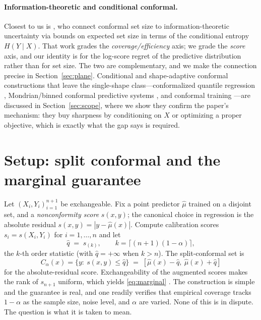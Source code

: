 \documentclass[11pt]{article}
\theoremstyle{definition}
\begin{document}
\paragraph{Information-theoretic and conditional conformal.}
Closest to us is \citet{correia2024information}, who connect conformal set size to
information-theoretic uncertainty via bounds on expected set size in terms of the conditional
entropy $H(Y\mid X)$. That work grades the \emph{coverage/efficiency} axis; we grade the
\emph{score} axis, and our identity is for the log-score regret of the predictive
distribution rather than for set size. The two are complementary, and we make the connection
precise in Section~\ref{sec:plane}. Conditional and shape-adaptive conformal constructions
that leave the single-shape class---conformalized quantile regression
\citep{romano2019conformalized}, Mondrian/binned conformal predictive systems
\citep{bostrom2021mondrian,toccaceli2026crps}, and conformal training
\citep{stutz2022learning}---are discussed in Section~\ref{sec:scope}, where we show they
confirm the paper's mechanism: they buy sharpness by conditioning on $X$ or optimizing a
proper objective, which is exactly what the gap says is required.

\section{Setup: split conformal and the marginal guarantee}\label{sec:setup}

Let $(X_i,Y_i)_{i=1}^{n+1}$ be exchangeable. Fix a point predictor $\hat\mu$ trained on
a disjoint set, and a \emph{nonconformity score} $s(x,y)$; the canonical choice in
regression is the absolute residual $s(x,y)=|y-\hat\mu(x)|$. Compute calibration
scores $s_i=s(X_i,Y_i)$ for $i=1,\dots,n$ and let
\begin{equation}\label{eq:q}
  \hat q \;=\; s_{(k)}, \qquad k=\big\lceil (n+1)(1-\alpha)\big\rceil,
\end{equation}
the $k$-th order statistic (with $\hat q=+\infty$ when $k>n$). The split-conformal set is
\begin{equation}\label{eq:set}
  C_\alpha(x)=\{y:\ s(x,y)\le \hat q\}
  \;=\;[\hat\mu(x)-\hat q,\ \hat\mu(x)+\hat q]
\end{equation}
for the absolute-residual score. Exchangeability of the augmented scores makes the rank
of $s_{n+1}$ uniform, which yields \eqref{eq:marginal}
\citep{vovk2005algorithmic,lei2018distribution}. The construction is simple and the
guarantee is real, and one readily verifies that empirical coverage tracks $1-\alpha$ as
the sample size, noise level, and $\alpha$ are varied. None of this is in dispute. The
question is what it is taken to mean.
\end{document}
